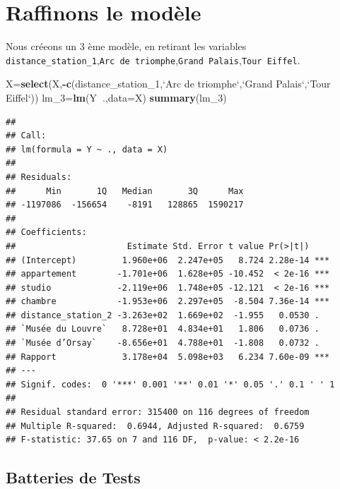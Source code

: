 \documentclass[french,]{article}
\newenvironment{Shaded}{\begin{snugshade}}{\end{snugshade}}
\newcommand{\DataTypeTok}[1]{\textcolor[rgb]{0.13,0.29,0.53}{#1}}
\newcommand{\DecValTok}[1]{\textcolor[rgb]{0.00,0.00,0.81}{#1}}
\newcommand{\KeywordTok}[1]{\textcolor[rgb]{0.13,0.29,0.53}{\textbf{#1}}}
\newcommand{\NormalTok}[1]{#1}
\newcommand{\OperatorTok}[1]{\textcolor[rgb]{0.81,0.36,0.00}{\textbf{#1}}}
\newcommand{\StringTok}[1]{\textcolor[rgb]{0.31,0.60,0.02}{#1}}
\begin{document}
\hypertarget{raffinons-le-moduxe8le}{%
\section{Raffinons le modèle}\label{raffinons-le-moduxe8le}}

Nous créeons un 3 ème modèle, en retirant les variables
\texttt{distance\_station\_1},\texttt{Arc\ de\ triomphe},\texttt{Grand\ Palais},\texttt{Tour\ Eiffel}.

\begin{Shaded}
\begin{Highlighting}[]
\NormalTok{X=}\KeywordTok{select}\NormalTok{(X,}\OperatorTok{-}\KeywordTok{c}\NormalTok{(distance_station_}\DecValTok{1}\NormalTok{,}\StringTok{`}\DataTypeTok{Arc de triomphe}\StringTok{`}\NormalTok{,}\StringTok{`}\DataTypeTok{Grand Palais}\StringTok{`}\NormalTok{,}\StringTok{`}\DataTypeTok{Tour Eiffel}\StringTok{`}\NormalTok{))}
\NormalTok{lm_}\DecValTok{3}\NormalTok{=}\KeywordTok{lm}\NormalTok{(Y}\OperatorTok{~}\NormalTok{.,}\DataTypeTok{data=}\NormalTok{X)  }
\KeywordTok{summary}\NormalTok{(lm_}\DecValTok{3}\NormalTok{)}
\end{Highlighting}
\end{Shaded}

\begin{verbatim}
## 
## Call:
## lm(formula = Y ~ ., data = X)
## 
## Residuals:
##      Min       1Q   Median       3Q      Max 
## -1197086  -156654    -8191   128865  1590217 
## 
## Coefficients:
##                      Estimate Std. Error t value Pr(>|t|)    
## (Intercept)         1.960e+06  2.247e+05   8.724 2.28e-14 ***
## appartement        -1.701e+06  1.628e+05 -10.452  < 2e-16 ***
## studio             -2.119e+06  1.748e+05 -12.121  < 2e-16 ***
## chambre            -1.953e+06  2.297e+05  -8.504 7.36e-14 ***
## distance_station_2 -3.263e+02  1.669e+02  -1.955   0.0530 .  
## `Musée du Louvre`   8.728e+01  4.834e+01   1.806   0.0736 .  
## `Musée d’Orsay`    -8.656e+01  4.788e+01  -1.808   0.0732 .  
## Rapport             3.178e+04  5.098e+03   6.234 7.60e-09 ***
## ---
## Signif. codes:  0 '***' 0.001 '**' 0.01 '*' 0.05 '.' 0.1 ' ' 1
## 
## Residual standard error: 315400 on 116 degrees of freedom
## Multiple R-squared:  0.6944, Adjusted R-squared:  0.6759 
## F-statistic: 37.65 on 7 and 116 DF,  p-value: < 2.2e-16
\end{verbatim}

\hypertarget{batteries-de-tests}{%
\subsection{Batteries de Tests}\label{batteries-de-tests}}
\end{document}
